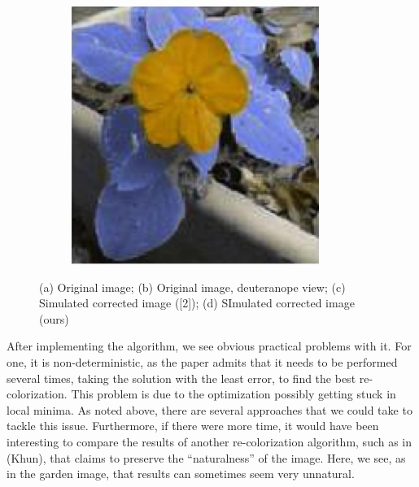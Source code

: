 \documentclass[10pt,twocolumn,letterpaper]{article}
\begin{document}
\begin{figure}[h]
\begin{subfigure}{0.23\textwidth}
    \caption{}
  \end{subfigure}
  \begin{subfigure}{0.23\textwidth}
    \includegraphics[width=\textwidth]{flower4.png}
    \caption{}
  \end{subfigure}
  \caption{(a) Original image; (b) Original image, deuteranope view; (c) Simulated corrected image ([2]); (d) SImulated corrected image (ours)}
  \label{fig:flower}
\end{figure}

	After implementing the algorithm, we see obvious practical problems with it. For one, it is non-deterministic, as the paper admits that it needs to be performed several times, taking the solution with the least error, to find the best re-colorization. This problem is due to the optimization possibly getting stuck in local minima. As noted above, there are several approaches that we could take to tackle this issue. Furthermore, if there were more time, it would have been interesting to compare the results of another re-colorization algorithm, such as in (Khun), that claims to preserve the “naturalness” of the image. Here, we see, as in the garden image, that results can sometimes seem very unnatural. 
\end{document}
